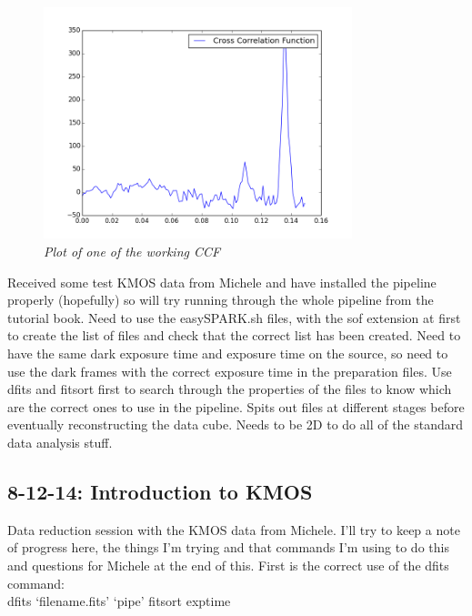 \documentclass{literature}
\begin{document}
\begin{figure}[!htp]
\centering
\includegraphics[width=0.8\textwidth]{Cross_corr.png}
\caption{\footnotesize{\emph{Plot of one of the working CCF}}}
\label{fig:cross_cor}
\end{figure}

Received some test KMOS data from Michele and have installed the pipeline properly (hopefully) so will try running through the whole pipeline from the tutorial book. Need to use the easySPARK.sh files, with the sof extension at first to create the list of files and check that the correct list has been created. Need to have the same dark exposure time and exposure time on the source, so need to use the dark frames with the correct exposure time in the preparation files. Use dfits and fitsort first to search through the properties of the files to know which are the correct ones to use in the pipeline. Spits out files at different stages before eventually reconstructing the data cube. Needs to be 2D to do all of the standard data analysis stuff.

\subsection{8-12-14: Introduction to KMOS}
Data reduction session with the KMOS data from Michele. I'll try to keep a note of progress here, the things I'm trying and that commands I'm using to do this and questions for Michele at the end of this. First is the correct use of the dfits command: \\

dfits `filename.fits' `pipe' fitsort exptime \\ 
\end{document}
